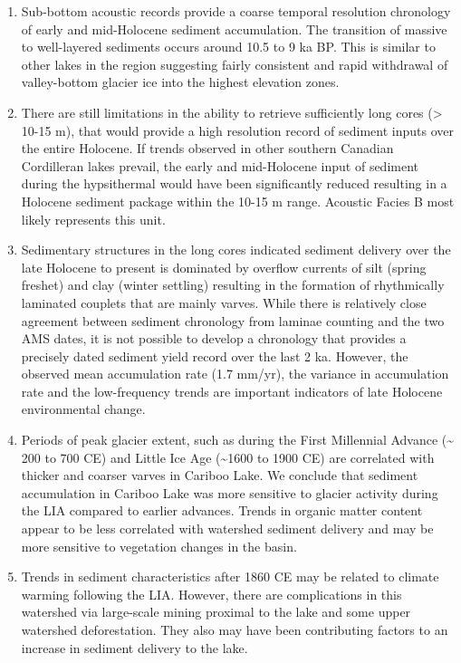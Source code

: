 \documentclass[Royal,times,doublespace,sageh]{sagej}
\providecommand{\tightlist}{%
  \setlength{\itemsep}{0pt}\setlength{\parskip}{0pt}}
\begin{document}
\begin{enumerate}
\def\labelenumi{\arabic{enumi}.}
\tightlist
\item
  Sub-bottom acoustic records provide a coarse temporal resolution
  chronology of early and mid-Holocene sediment accumulation. The
  transition of massive to well-layered sediments occurs around 10.5 to
  9 ka BP. This is similar to other lakes in the region suggesting
  fairly consistent and rapid withdrawal of valley-bottom glacier ice
  into the highest elevation zones.
\item
  There are still limitations in the ability to retrieve sufficiently
  long cores (\textgreater{} 10-15 m), that would provide a high
  resolution record of sediment inputs over the entire Holocene. If
  trends observed in other southern Canadian Cordilleran lakes prevail,
  the early and mid-Holocene input of sediment during the hypsithermal
  would have been significantly reduced resulting in a Holocene sediment
  package within the 10-15 m range. Acoustic Facies B most likely
  represents this unit.
\item
  Sedimentary structures in the long cores indicated sediment delivery
  over the late Holocene to present is dominated by overflow currents of
  silt (spring freshet) and clay (winter settling) resulting in the
  formation of rhythmically laminated couplets that are mainly varves.
  While there is relatively close agreement between sediment chronology
  from laminae counting and the two AMS dates, it is not possible to
  develop a chronology that provides a precisely dated sediment yield
  record over the last 2 ka. However, the observed mean accumulation
  rate (1.7 mm/yr), the variance in accumulation rate and the
  low-frequency trends are important indicators of late Holocene
  environmental change.
\item
  Periods of peak glacier extent, such as during the First Millennial
  Advance (\textasciitilde{} 200 to 700 CE) and Little Ice Age
  (\textasciitilde1600 to 1900 CE) are correlated with thicker and
  coarser varves in Cariboo Lake. We conclude that sediment accumulation
  in Cariboo Lake was more sensitive to glacier activity during the LIA
  compared to earlier advances. Trends in organic matter content appear
  to be less correlated with watershed sediment delivery and may be more
  sensitive to vegetation changes in the basin.
\item
  Trends in sediment characteristics after 1860 CE may be related to
  climate warming following the LIA. However, there are complications in
  this watershed via large-scale mining proximal to the lake and some
  upper watershed deforestation. They also may have been contributing
  factors to an increase in sediment delivery to the lake.
\end{enumerate}
\end{document}

